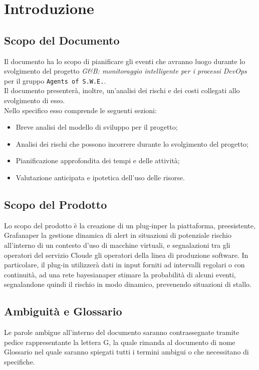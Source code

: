 \section{Introduzione}

\subsection{Scopo del Documento}
Il documento ha lo scopo di pianificare gli eventi che avranno luogo durante lo svolgimento del progetto \textit{G\&B: monitoraggio intelligente per i processi DevOps\glossario} per il gruppo \texttt{Agents of S.W.E.}.\\
Il documento presenterà, inoltre, un'analisi dei rischi e dei costi collegati allo svolgimento di esso. \\
Nello specifico esso comprende le seguenti sezioni:
\begin{itemize}
\item Breve analisi del modello di sviluppo per il progetto;
\item Analisi dei rischi che possono incorrere durante lo svolgimento del progetto;
\item Pianificazione approfondita dei tempi e delle attività;
\item Valutazione anticipata e ipotetica dell'uso delle risorse.
\end{itemize}
 
\subsection{Scopo del Prodotto} 
Lo scopo del prodotto è la creazione di un plug-in\glossario  per la piattaforma, preesistente,
Grafana\glossario per la gestione dinamica di alert in situazioni di potenziale rischio all’interno
di un contesto d’uso di macchine virtuali, e segnalazioni tra gli operatori del servizio
Cloud\glossario e gli operatori della linea di produzione software. In particolare, il plug-in
utilizzerà dati in input forniti ad intervalli regolari o con continuità, ad una rete
bayesiana\glossario per stimare la probabilità di alcuni eventi, segnalandone quindi il rischio
in modo dinamico, prevenendo situazioni di stallo.
 
\subsection{Ambiguità e Glossario}
Le parole ambigue all'interno del documento saranno contrassegnate tramite pedice rappresentante la lettera \textmd{G}, la quale rimanda al documento di nome Glossario nel quale saranno spiegati tutti i termini ambigui o che necessitano di specifiche.

